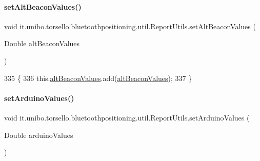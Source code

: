 \paragraph{\texorpdfstring{set\+Alt\+Beacon\+Values()}{setAltBeaconValues()}}
{\footnotesize\ttfamily void it.\+unibo.\+torsello.\+bluetoothpositioning.\+util.\+Report\+Utils.\+set\+Alt\+Beacon\+Values (\begin{DoxyParamCaption}\item[{Double}]{alt\+Beacon\+Values }\end{DoxyParamCaption})}


\begin{DoxyCode}
335                                                            \{
336         this.\hyperlink{classit_1_1unibo_1_1torsello_1_1bluetoothpositioning_1_1util_1_1ReportUtils_a6e72cc0d840390d44e6cbccece68e240_a6e72cc0d840390d44e6cbccece68e240}{altBeaconValues}.add(\hyperlink{classit_1_1unibo_1_1torsello_1_1bluetoothpositioning_1_1util_1_1ReportUtils_a6e72cc0d840390d44e6cbccece68e240_a6e72cc0d840390d44e6cbccece68e240}{altBeaconValues});
337     \}
\end{DoxyCode}
\hypertarget{classit_1_1unibo_1_1torsello_1_1bluetoothpositioning_1_1util_1_1ReportUtils_a3fbc76f4a952ebae654b238dbef6ca1d_a3fbc76f4a952ebae654b238dbef6ca1d}{}\label{classit_1_1unibo_1_1torsello_1_1bluetoothpositioning_1_1util_1_1ReportUtils_a3fbc76f4a952ebae654b238dbef6ca1d_a3fbc76f4a952ebae654b238dbef6ca1d} 
\paragraph{\texorpdfstring{set\+Arduino\+Values()}{setArduinoValues()}}
{\footnotesize\ttfamily void it.\+unibo.\+torsello.\+bluetoothpositioning.\+util.\+Report\+Utils.\+set\+Arduino\+Values (\begin{DoxyParamCaption}\item[{Double}]{arduino\+Values }\end{DoxyParamCaption})}


